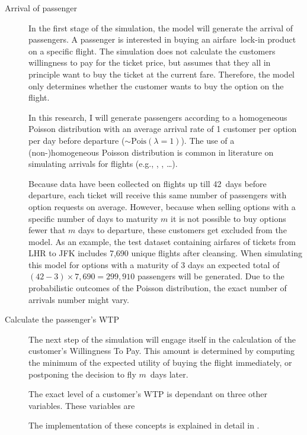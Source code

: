 \begin{description}
\item[Arrival of passenger] In the first stage of the simulation, the model will generate the arrival of passengers. A passenger is interested in buying an airfare~lock-in product on a specific flight. The simulation does not calculate the customers willingness to pay for the ticket price, but assumes that they all in principle want to buy the ticket at the current fare. Therefore, the model only determines whether the customer wants to buy the option on the flight.

In this research, I will generate passengers according to a homogeneous Poisson distribution with an average arrival rate of 1 customer per option per day before departure ($\sim \mbox{Pois}(\lambda=1)$). The use of a (non-)homogeneous Poisson distribution is common in literature on simulating arrivals for flights (e.g., , , \ldots).

Because data have been collected on flights up till 42~days before departure, each ticket will receive this same number of passengers with option requests on average. However, because when selling options with a specific number of days to maturity $m$ it is not possible to buy options fewer that $m$ days to departure, these customers get excluded from the model. As an example, the test dataset containing airfares of tickets from LHR to JFK includes 7,690 unique flights after cleansing. When simulating this model for options with a maturity of 3 days an expected total of $(42 - 3) \times 7,690 = 299,910$ passengers will be generated. Due to the probabilistic outcomes of the Poisson distribution, the exact number of arrivals number might vary.

\item[Calculate the passenger's WTP] The next step of the simulation will engage itself in the calculation of the customer's Willingness To Pay. This amount is determined by computing the minimum of the expected utility of buying the flight immediately, or postponing the decision to fly $m$~days later.

The exact level of a customer's WTP is dependant on three other variables. These variables are
The implementation of these concepts is explained in detail in .


\end{description}
